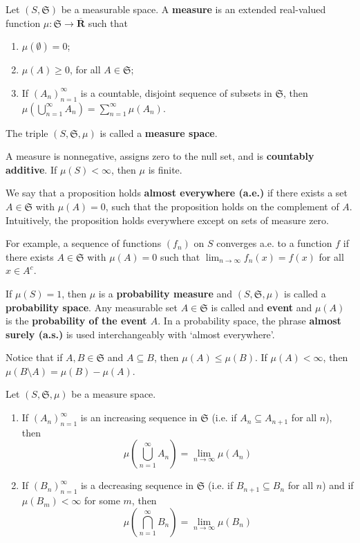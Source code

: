 \begin{definition}[]{}{}
	Let $(S, \mathfrak{S})$ be a measurable space. A \textbf{measure} is an extended real-valued function $\mu : \mathfrak{S} \longrightarrow \overline{\textbf{R}}$ such that 
	\begin{enumerate}
		\item $\mu ( \emptyset ) = 0$;
		\item $\mu(A) \geq 0$, for all $A \in \mathfrak{S}$;
		\item If $(A_n)_{n=1}^\infty$ is a countable, disjoint sequence of subsets in $\mathfrak{S}$, then $\mu(\bigcup_{n=1}^\infty A_n) = \sum_{n=1}^\infty \mu(A_n)$.
	\end{enumerate}

	The triple $(S, \mathfrak{S}, \mu)$ is called a \textbf{measure space}.
\end{definition}

A measure is nonnegative, assigns zero to the null set, and is \textbf{countably additive}. If $\mu(S) < \infty$, then $\mu$ is finite.

We say that a proposition holds \textbf{almost everywhere (a.e.)} if there exists a set $A \in \mathfrak{S}$ with $\mu(A) = 0$, such that the proposition holds on the complement of $A$. Intuitively, the proposition holds everywhere except on sets of measure zero.

For example, a sequence of functions $(f_n)$ on $S$ converges a.e. to a function $f$ if there exists $A \in \mathfrak{S}$ with $\mu(A) = 0$ such that $\lim_{n \to \infty} f_n(x) = f(x)$ for all $x \in A^c$.

If $\mu(S) = 1$, then $\mu$ is a \textbf{probability measure} and $(S, \mathfrak{S}, \mu)$ is called a \textbf{probability space}. Any measurable set $A \in \mathfrak{S}$ is called and \textbf{event} and $\mu(A)$ is the \textbf{probability of the event $A$}. In a probability space, the phrase \textbf{almost surely (a.s.)} is used interchangeably with `almost everywhere'.

Notice that if $A, B \in \mathfrak{S}$ and $A \subseteq B$, then $\mu(A) \leq \mu(B)$. If $\mu(A) < \infty$, then $\mu(B \setminus A) = \mu(B) - \mu(A)$.

\begin{theorem}[]{}{}
	Let $(S, \mathfrak{S}, \mu)$ be a measure space.
	\begin{enumerate}
		\item If $(A_n)_{n=1}^\infty$ is an increasing sequence in $\mathfrak{S}$ (i.e. if $A_n \subseteq A_{n+1}$ for all $n$), then \[ \mu \left( \bigcup_{n=1}^\infty A_n \right) = \lim_{n \to \infty} \mu(A_n) \] 
		\item If $(B_n)_{n=1}^\infty$ is a decreasing sequence in $\mathfrak{S}$ (i.e. if $B_{n+1} \subseteq B_n$ for all $n$) and if $\mu(B_m) < \infty$ for some $m$, then \[ \mu \left( \bigcap_{n=1}^\infty B_n \right) = \lim_{n \to \infty} \mu(B_n) \] 
	\end{enumerate}
\end{theorem}

